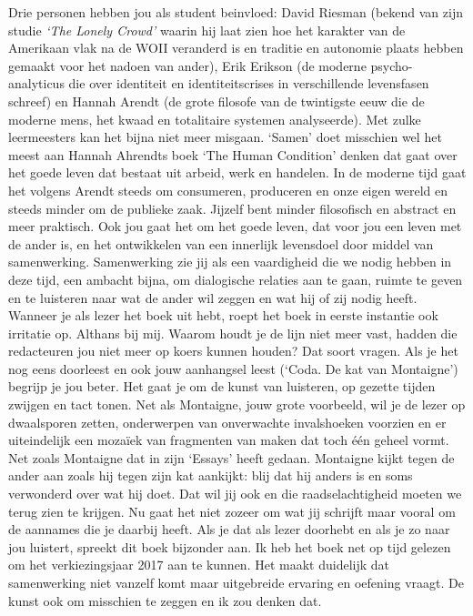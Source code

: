 \documentclass[]{book}
\begin{document}
Drie personen hebben jou als student beinvloed: David Riesman (bekend
van zijn studie \emph{`The Lonely Crowd'} waarin hij laat zien hoe het
karakter van de Amerikaan vlak na de WOII veranderd is en traditie en
autonomie plaats hebben gemaakt voor het nadoen van ander), Erik Erikson
(de moderne psycho-analyticus die over identiteit en identiteitscrises
in verschillende levensfasen schreef) en Hannah Arendt (de grote
filosofe van de twintigste eeuw die de moderne mens, het kwaad en
totalitaire systemen analyseerde). Met zulke leermeesters kan het bijna
niet meer misgaan. `Samen' doet misschien wel het meest aan Hannah
Ahrendts boek `The Human Condition' denken dat gaat over het goede leven
dat bestaat uit arbeid, werk en handelen. In de moderne tijd gaat het
volgens Arendt steeds om consumeren, produceren en onze eigen wereld en
steeds minder om de publieke zaak. Jijzelf bent minder filosofisch en
abstract en meer praktisch. Ook jou gaat het om het goede leven, dat
voor jou een leven met de ander is, en het ontwikkelen van een innerlijk
levensdoel door middel van samenwerking. Samenwerking zie jij als een
vaardigheid die we nodig hebben in deze tijd, een ambacht bijna, om
dialogische relaties aan te gaan, ruimte te geven en te luisteren naar
wat de ander wil zeggen en wat hij of zij nodig heeft. Wanneer je als
lezer het boek uit hebt, roept het boek in eerste instantie ook
irritatie op. Althans bij mij. Waarom houdt je de lijn niet meer vast,
hadden die redacteuren jou niet meer op koers kunnen houden? Dat soort
vragen. Als je het nog eens doorleest en ook jouw aanhangsel leest
(`Coda. De kat van Montaigne') begrijp je jou beter. Het gaat je om de
kunst van luisteren, op gezette tijden zwijgen en tact tonen. Net als
Montaigne, jouw grote voorbeeld, wil je de lezer op dwaalsporen zetten,
onderwerpen van onverwachte invalshoeken voorzien en er uiteindelijk een
mozaïek van fragmenten van maken dat toch één geheel vormt. Net zoals
Montaigne dat in zijn `Essays' heeft gedaan. Montaigne kijkt tegen de
ander aan zoals hij tegen zijn kat aankijkt: blij dat hij anders is en
soms verwonderd over wat hij doet. Dat wil jij ook en die
raadselachtigheid moeten we terug zien te krijgen. Nu gaat het niet
zozeer om wat jij schrijft maar vooral om de aannames die je daarbij
heeft. Als je dat als lezer doorhebt en als je zo naar jou luistert,
spreekt dit boek bijzonder aan. Ik heb het boek net op tijd gelezen om
het verkiezingsjaar 2017 aan te kunnen. Het maakt duidelijk dat
samenwerking niet vanzelf komt maar uitgebreide ervaring en oefening
vraagt. De kunst ook om misschien te zeggen en ik zou denken dat.
\end{document}
